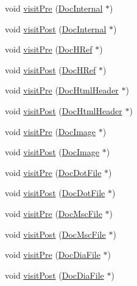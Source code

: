 \begin{DoxyCompactItemize}
void \hyperlink{class_html_doc_visitor_a691852ab29cce1941ece33bddae94909}{visit\+Pre} (\hyperlink{class_doc_internal}{Doc\+Internal} $\ast$)
\item 
void \hyperlink{class_html_doc_visitor_af6199c3486d2d55af0f937eeeac1af10}{visit\+Post} (\hyperlink{class_doc_internal}{Doc\+Internal} $\ast$)
\item 
void \hyperlink{class_html_doc_visitor_a853739bd4b1cc3787a24bc204e8e21db}{visit\+Pre} (\hyperlink{class_doc_h_ref}{Doc\+H\+Ref} $\ast$)
\item 
void \hyperlink{class_html_doc_visitor_a4bf264036c06a569b4bd0de444f31a9d}{visit\+Post} (\hyperlink{class_doc_h_ref}{Doc\+H\+Ref} $\ast$)
\item 
void \hyperlink{class_html_doc_visitor_ae1dc90f5b1d0d46fe6008b54d8d73fd8}{visit\+Pre} (\hyperlink{class_doc_html_header}{Doc\+Html\+Header} $\ast$)
\item 
void \hyperlink{class_html_doc_visitor_a5b9be493d5397433f30823ff6087a222}{visit\+Post} (\hyperlink{class_doc_html_header}{Doc\+Html\+Header} $\ast$)
\item 
void \hyperlink{class_html_doc_visitor_adf0d9665252ee77563b7b885f4c95c7c}{visit\+Pre} (\hyperlink{class_doc_image}{Doc\+Image} $\ast$)
\item 
void \hyperlink{class_html_doc_visitor_a825358af6474fd8c0904544adb7ed563}{visit\+Post} (\hyperlink{class_doc_image}{Doc\+Image} $\ast$)
\item 
void \hyperlink{class_html_doc_visitor_ac603edcce77cc7adf36d37b1803175ea}{visit\+Pre} (\hyperlink{class_doc_dot_file}{Doc\+Dot\+File} $\ast$)
\item 
void \hyperlink{class_html_doc_visitor_a9a6cba718ebe2738418aef45ebaec9fa}{visit\+Post} (\hyperlink{class_doc_dot_file}{Doc\+Dot\+File} $\ast$)
\item 
void \hyperlink{class_html_doc_visitor_a8d0aeaac2c77d116e0e709fa4b999669}{visit\+Pre} (\hyperlink{class_doc_msc_file}{Doc\+Msc\+File} $\ast$)
\item 
void \hyperlink{class_html_doc_visitor_a3348aace50564563f7aebb3c2d49bcd0}{visit\+Post} (\hyperlink{class_doc_msc_file}{Doc\+Msc\+File} $\ast$)
\item 
void \hyperlink{class_html_doc_visitor_af9db6a7236bf32da8c148119ff613277}{visit\+Pre} (\hyperlink{class_doc_dia_file}{Doc\+Dia\+File} $\ast$)
\item 
void \hyperlink{class_html_doc_visitor_a91868e649dccf1f6b5638c3feb990c66}{visit\+Post} (\hyperlink{class_doc_dia_file}{Doc\+Dia\+File} $\ast$)
\item 

\end{DoxyCompactItemize}
